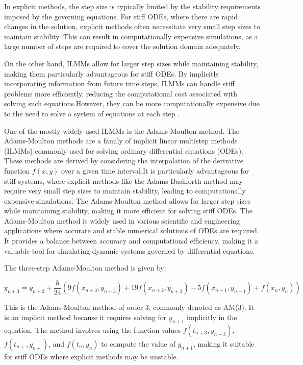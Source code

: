 In explicit methods, the step size is typically limited by the stability requirements imposed by the governing equations. For stiff ODEs, where there are rapid changes in the solution, explicit methods often necessitate very small step sizes to maintain stability. This can result in computationally expensive simulations, as a large number of steps are required to cover the solution domain adequately.

On the other hand, ILMMs allow for larger step sizes while maintaining stability, making them particularly advantageous for stiff ODEs. By implicitly incorporating information from future time steps, ILMMs can handle stiff problems more efficiently, reducing the computational cost associated with solving such equations.However, they can be more computationally expensive due to the need to solve a system of equations at each step \cite{thohura2013numerical}.

One of the mostly widely used ILMMs is the Adams-Moulton method. The Adams-Moulton methods are a family of implicit linear multistep methods (ILMMs) commonly used for solving ordinary differential equations (ODEs). These methods are derived by considering the interpolation of the derivative function $f(x,y)$ over a given time interval.It is particularly advantageous for stiff systems, where explicit methods like the Adams-Bashforth method may require very small step sizes to maintain stability, leading to computationally expensive simulations. The Adams-Moulton method allows for larger step sizes while maintaining stability, making it more efficient for solving stiff ODEs.
The Adams-Moulton method is widely used in various scientific and engineering applications where accurate and stable numerical solutions of ODEs are required. It provides a balance between accuracy and computational efficiency, making it a valuable tool for simulating dynamic systems governed by differential equations.

The three-step Adams-Moulton method is given by:

\[
y_{n+3} = y_{n+2} + \frac{h}{24} \left( 9 f(x_{n+3}, y_{n+3}) + 19 f(x_{n+2}, y_{n+2}) - 5 f(x_{n+1}, y_{n+1}) + f(x_{n}, y_{n}) \right)
\]


This is the Adams-Moulton method of order 3, commonly denoted as AM(3). It is an implicit method because it requires solving for \( y_{n+1} \) implicitly in the equation. The method involves using the function values \( f(t_{n+3}, y_{n+3}) \), \( f(t_{n+}, y_{n+}) \), and \( f(t_n, y_n) \) to compute the value of \( y_{n+1} \), making it suitable for stiff ODEs where explicit methods may be unstable.


